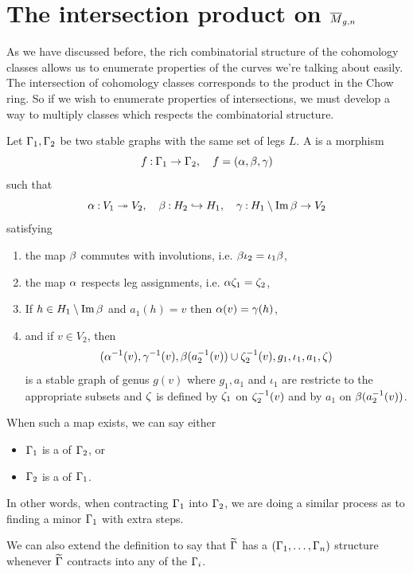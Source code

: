 \documentclass[12pt]{memoir}
\begin{document}
\section{The intersection product on $\overline M_{g,n}$}

As we have discussed before, the rich combinatorial structure of the cohomology classes allows us to enumerate properties of the curves we're talking about easily. The intersection of cohomology classes corresponds to the product in the Chow ring. So if we wish to enumerate properties of intersections, we must develop a way to multiply classes which respects the combinatorial structure.
 
\begin{Def}
Let $\Gamma_1,\Gamma_2$ be two stable graphs with the same set of legs $L$. A  is a morphism
$$f\mathbin{:}\Gamma_1\to\Gamma_2,\quad f=(\alpha,\beta,\gamma)$$
such that
$$\alpha\mathbin{:} V_1\twoheadrightarrow V_2,\quad\beta\mathbin{:} H_2\hookrightarrow H_1,\quad\gamma\mathbin{:} H_1\setminus\Im\beta\to V_2$$
satisfying
\begin{enumerate}
    \item the map $\beta$ commutes with involutions, i.e. $\beta\iota_2=\iota_1\beta$,
    \item the map $\alpha$ respects leg assignments, i.e. $\alpha\zeta_1=\zeta_2$,
    \item If $h\in H_1\setminus\Im\beta$ and $a_1(h)=v$ then $\alpha(v)=\gamma(h)$, 
    \item and if $v\in V_2$, then 
    $$(\alpha^{-1}(v),\gamma^{-1}(v),\beta(a^{-1}_2(v))\cup\zeta_2^{-1}(v),g_1,\iota_1,a_1,\zeta)$$
    is a stable graph of genus $g(v)$ where $g_1,a_1$ and $\iota_1$ are restricte to the appropriate subsets and $\zeta$ is defined by $\zeta_1$ on $\zeta_2^{-1}(v)$ and by $a_1$ on $\beta(a^{-1}_2(v))$.
\end{enumerate}
When such a map exists, we can say either
\begin{itemize}
    \item $\Gamma_1$ is a  of $\Gamma_2$, or
    \item $\Gamma_2$ is a  of $\Gamma_1$.
\end{itemize}
\end{Def}

\begin{Rmk}
    In other words, when contracting $\Gamma_1$ into $\Gamma_2$, we are doing a similar process as to finding a minor $\Gamma_1$ with extra steps.\par
    We can also extend the definition to say that $\widetilde{\Gamma}$ has a $(\Gamma_1,\dots,\Gamma_n)$ structure whenever $\widetilde{\Gamma}$ contracts into any of the $\Gamma_i$.
\end{Rmk}
\end{document}
